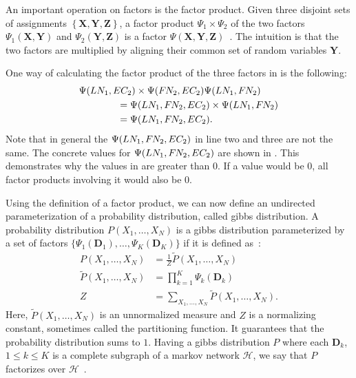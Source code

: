An important operation on factors is the \gls{factor product}.
Given three disjoint sets of \glspl{assignment} $\left\{\mathbf{X}, \mathbf{Y}, \mathbf{Z}\right\}$, a \gls{factor product} $\Psi_1\times\Psi_2$ of the two factors $\Psi_1(\mathbf{X},\mathbf{Y})$ and $\Psi_2(\mathbf{Y},\mathbf{Z})$ is a factor $\Psi(\mathbf{X},\mathbf{Y},\mathbf{Z})$~\citep{koller2009probabilistic}.
The intuition is that the two factors are multiplied by aligning their common set of \glspl{random variable} $\mathbf{Y}$.

One way of calculating the \gls{factor product} of the three \glspl{factor} in  is the following:
\begin{equation*}
  \begin{split}
  &\Psi(LN_1,EC_2)\times\Psi(F\hspace{-0.07em} N_2,EC_2)\Psi(LN_1,F\hspace{-0.07em} N_2)\\
  &\hspace{4em}=\Psi(LN_1,F\hspace{-0.07em} N_2,EC_2)\times\Psi(LN_1,F\hspace{-0.07em} N_2)\\
  &\hspace{4em}=\Psi(LN_1,F\hspace{-0.07em} N_2,EC_2).
  \end{split}
\end{equation*}
Note that in general the $\Psi(LN_1,F\hspace{-0.07em} N_2,EC_2)$ in line two and three are not the same.
The concrete values for $\Psi(LN_1,F\hspace{-0.07em} N_2,EC_2)$ are shown in .
This demonstrates why the values in  are greater than $0$.
If a value would be $0$, all factor products involving it would also be $0$.

\bigskip

Using the definition of a \gls{factor product}, we can now define an undirected parameterization of a \gls{probability distribution}, called \gls{gibbs distribution}.
A \gls{probability distribution} $P(X_1,\dots,X_N)$ is a \gls{gibbs distribution} parameterized by a set of \glspl{factor} $\{\Psi_1(\mathbf{D}_1),\dots,\Psi_K(\mathbf{D}_K)\}$ if it is defined as~\citep{koller2009probabilistic}:
\begin{equation}
  \label{equ:gibbs-distribution}
  \begin{split}
  P\left(X_1,\dots,X_N\right) & =\frac{1}{Z}\tilde{P}\left(X_1,\dots,X_N\right) \\
  \tilde{P}\left(X_1,\dots,X_N\right) & =\prod_{k=1}^{K}\Psi_k\left(\mathbf{D}_k\right) \\
  Z & =\sum_{X_1,\ldots,X_N}\tilde{P}\left(X_1,\dots,X_N\right).
  \end{split}
\end{equation}
Here, $\tilde{P}(X_1,\dots,X_N)$ is an unnormalized measure and $Z$ is a normalizing constant, sometimes called the \gls{partitioning function}.
It guarantees that the \gls{probability distribution} sums to $1$.
Having a \gls{gibbs distribution} $P$ where each $\mathbf{D}_k$, $1\leq k \leq K$ is a complete subgraph of a \gls{markov network} $\mathcal{H}$, we say that $P$ factorizes over $\mathcal{H}$~\citep{koller2009probabilistic}.

